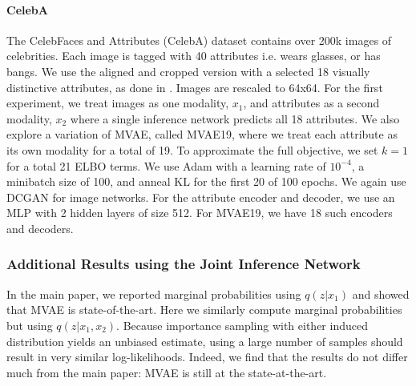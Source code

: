 \paragraph{CelebA}
The CelebFaces and Attributes (CelebA) dataset \cite{yang2015facial} contains over 200k images of celebrities. Each image is tagged with 40 attributes i.e. wears glasses, or has bangs. We use the aligned and cropped version with a selected 18 visually distinctive attributes, as done in \cite{perarnau2016invertible}. Images are rescaled to 64x64.
For the first experiment, we treat images as one modality, $x_{1}$, and attributes as a second modality, $x_{2}$ where a single inference network predicts all 18 attributes. We also explore a variation of MVAE, called MVAE19, where we treat each attribute as its own modality for a total of 19. To approximate the full objective, we set $k = 1$ for a total 21 ELBO terms.
We use Adam with a learning rate of $10^{-4}$, a minibatch size of 100, and anneal KL for the first 20 of 100 epochs. We again use DCGAN for image networks. For the attribute encoder and decoder, we use an MLP with 2 hidden layers of size 512. For MVAE19, we have 18 such encoders and decoders.

\subsubsection{Additional Results using the Joint Inference Network}

In the main paper, we reported marginal probabilities using $q(z|x_1)$ and showed that MVAE is state-of-the-art. Here we similarly compute marginal probabilities but using $q(z|x_1, x_2)$. Because importance sampling with either induced distribution yields an unbiased estimate, using a large number of samples should result in very similar log-likelihoods. Indeed, we find that the results do not differ much from the main paper: MVAE is still at the state-at-the-art.

